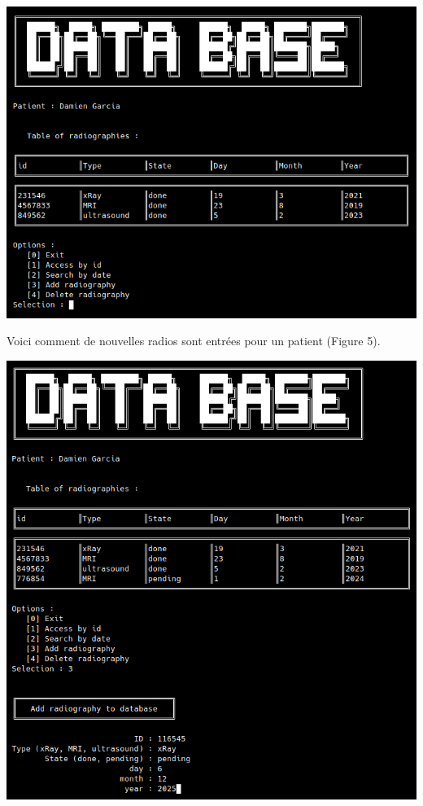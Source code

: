 \documentclass[12pt,a4paper]{article}
\newenvironment{Figure}
{\par\medskip\noindent\minipage{\linewidth}}
{\endminipage\par\medskip}
\begin{document}
\begin{multicols}{2}
		\begin{Figure}
			\centering
			\includegraphics[width=\linewidth]{images/walkthrough/doctor_patient_main.png}
			\label{fig:patient_menu}
		\end{Figure}
		
		Voici comment de nouvelles radios sont entrées pour un patient (Figure 5). \\
		
		\begin{Figure}
			\centering
			\includegraphics[width=\linewidth]{images/walkthrough/doctor_patient_add.png}
			\label{fig:add_patient}
		\end{Figure}
		

\end{multicols}
\end{document}
